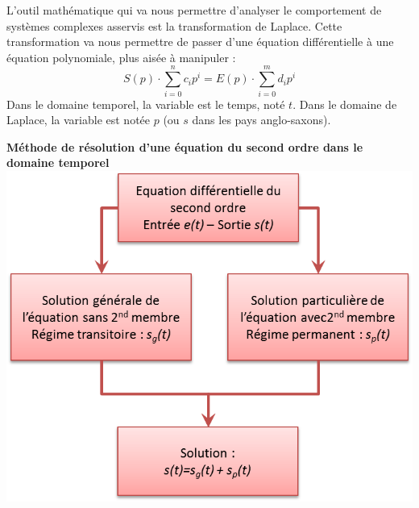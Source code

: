 \documentclass[11pt,oneside]{article}
\begin{document}
L'outil mathématique qui va nous permettre d'analyser le comportement de systèmes complexes asservis est la transformation de Laplace. Cette transformation va nous permettre de passer d'une équation différentielle à une équation polynomiale, plus aisée à manipuler :
$$
  S(p) \cdot  \sum\limits_{i=0}^n c_i p^i
= E(p) \cdot  \sum\limits_{i=0}^m d_i p^i
$$
Dans le domaine temporel, la variable est le temps, noté $t$. Dans le domaine de Laplace, la variable est notée $p$ (ou $s$ dans les pays anglo-saxons).

\begin{minipage}[c]{.45\linewidth}
\begin{center}
\textbf{Méthode de résolution d'une équation du second ordre dans le domaine temporel}
\includegraphics[width=\textwidth]{png/temporel}
\end{center}
\end{minipage} \hfill
\end{document}
